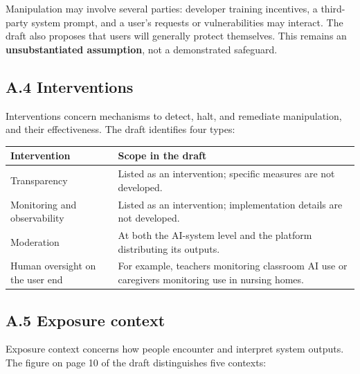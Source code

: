 \documentclass[
  english,
]{article}
\newcounter{none} %
\begin{document}
Manipulation may involve several parties: developer training incentives,
a third-party system prompt, and a user's requests or vulnerabilities
may interact. The draft also proposes that users will generally protect
themselves. This remains an \textbf{unsubstantiated assumption}, not a
demonstrated safeguard.

\clearpage

\subsection*{A.4 Interventions}\label{a.4-interventions}

Interventions concern mechanisms to detect, halt, and remediate
manipulation, and their effectiveness. The draft identifies four types:

{\def\LTcaptype{none} %
\begin{longtable}[]{@{}
  >{\raggedright\arraybackslash}p{}
  >{\raggedright\arraybackslash}p{}@{}}
\toprule\noalign{}
\begin{minipage}[b]{\linewidth}\raggedright
Intervention
\end{minipage} & \begin{minipage}[b]{\linewidth}\raggedright
Scope in the draft
\end{minipage} \\
\midrule\noalign{}
\endhead
\bottomrule\noalign{}
\endlastfoot
Transparency & Listed as an intervention; specific measures are not
developed. \\
Monitoring and observability & Listed as an intervention; implementation
details are not developed. \\
Moderation & At both the AI-system level and the platform distributing
its outputs. \\
Human oversight on the user end & For example, teachers monitoring
classroom AI use or caregivers monitoring use in nursing homes. \\
\end{longtable}
}

\subsection*{A.5 Exposure context}\label{a.5-exposure-context}

Exposure context concerns how people encounter and interpret system
outputs. The figure on page 10 of the draft distinguishes five contexts:
\end{document}
